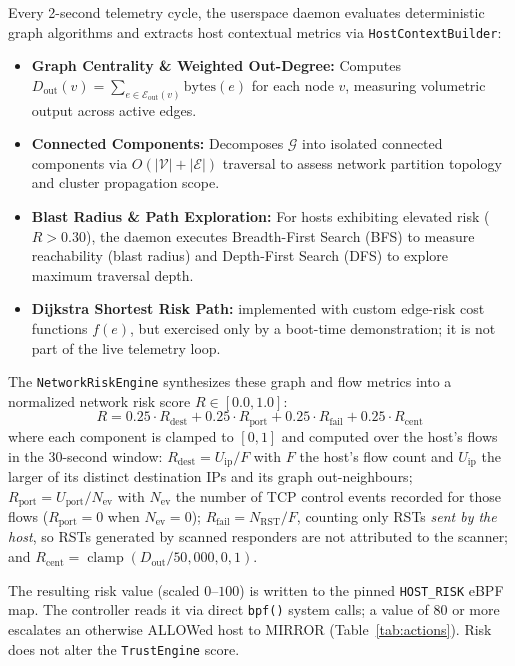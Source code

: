 \documentclass[conference]{IEEEtran}
\begin{document}
Every 2-second telemetry cycle, the userspace daemon evaluates deterministic graph algorithms and extracts host contextual metrics via \texttt{HostContextBuilder}:
\begin{itemize}
\item \textbf{Graph Centrality \& Weighted Out-Degree:} Computes $D_{\text{out}}(v) = \sum_{e \in \mathcal{E}_{\text{out}}(v)} \text{bytes}(e)$ for each node $v$, measuring volumetric output across active edges.
\item \textbf{Connected Components:} Decomposes $\mathcal{G}$ into isolated connected components via $O(|\mathcal{V}|+|\mathcal{E}|)$ traversal to assess network partition topology and cluster propagation scope.
\item \textbf{Blast Radius \& Path Exploration:} For hosts exhibiting elevated risk ($R > 0.30$), the daemon executes Breadth-First Search (BFS) to measure reachability (blast radius) and Depth-First Search (DFS) to explore maximum traversal depth.
\item \textbf{Dijkstra Shortest Risk Path:} implemented with custom edge-risk cost functions $f(e)$, but exercised only by a boot-time demonstration; it is not part of the live telemetry loop.
\end{itemize}

The \texttt{NetworkRiskEngine} synthesizes these graph and flow metrics into a normalized network risk score $R \in [0.0, 1.0]$:
\begin{equation}
R = 0.25 \cdot R_{\text{dest}} + 0.25 \cdot R_{\text{port}} + 0.25 \cdot R_{\text{fail}} + 0.25 \cdot R_{\text{cent}}
\end{equation}
where each component is clamped to $[0,1]$ and computed over the host's flows in the 30-second window: $R_{\text{dest}} = U_{\text{ip}} / F$ with $F$ the host's flow count and $U_{\text{ip}}$ the larger of its distinct destination IPs and its graph out-neighbours; $R_{\text{port}} = U_{\text{port}} / N_{\text{ev}}$ with $N_{\text{ev}}$ the number of TCP control events recorded for those flows ($R_{\text{port}} = 0$ when $N_{\text{ev}} = 0$); $R_{\text{fail}} = N_{\text{RST}} / F$, counting only RSTs \emph{sent by the host}, so RSTs generated by scanned responders are not attributed to the scanner; and $R_{\text{cent}} = \operatorname{clamp}(D_{\text{out}} / 50{,}000, 0, 1)$.

The resulting risk value (scaled $0$--$100$) is written to the pinned \texttt{HOST\_RISK} eBPF map. The controller reads it via direct \texttt{bpf()} system calls; a value of 80 or more escalates an otherwise ALLOWed host to MIRROR (Table~\ref{tab:actions}). Risk does not alter the \texttt{TrustEngine} score.
\end{document}
